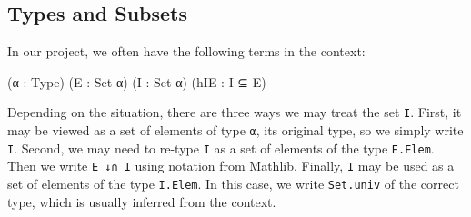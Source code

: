\subsection{Types and Subsets}

In our project, we often have the following terms in the context:
\begin{leancode}
(α : Type) (E : Set α) (I : Set α) (hIE : I ⊆ E)
\end{leancode}
Depending on the situation, there are three ways we may treat the set \texttt{I}. First, it may be viewed as a set of elements of type \texttt{α}, its original type, so we simply write \texttt{I}. Second, we may need to re-type \texttt{I} as a set of elements of the type \texttt{E.Elem}. Then we write \texttt{E ↓∩ I} using notation from Mathlib. Finally, \texttt{I} may be used as a set of elements of the type \texttt{I.Elem}. In this case, we write \texttt{Set.univ} of the correct type, which is usually inferred from the context.
